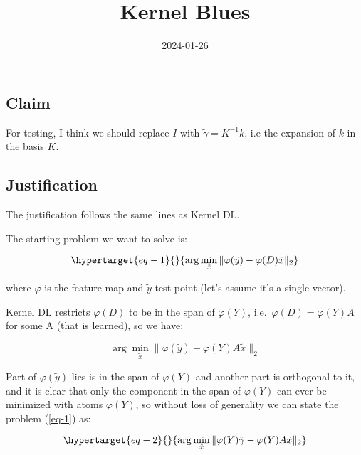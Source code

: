 \documentclass[
  letterpaper,
  DIV=11,
  numbers=noendperiod]{scrartcl}
\title{Kernel Blues}
\author{}
\date{2024-01-26}
\renewcommand*\contentsname{Table of contents}
\newcommand\contentsname{Table of contents}
\begin{document}
\maketitle
\ifdefined\Shaded\renewenvironment{Shaded}{\begin{tcolorbox}[frame hidden, sharp corners, borderline west={3pt}{0pt}{shadecolor}, breakable, enhanced, boxrule=0pt, interior hidden]}{\end{tcolorbox}}\fi

\renewcommand*\contentsname{Table of contents}
{
\hypersetup{linkcolor=}
\setcounter{tocdepth}{3}
\tableofcontents
}
\hypertarget{claim}{%
\subsection{Claim}\label{claim}}

For testing, I think we should replace \(I\) with
\(\tilde{\gamma} = K^{-1} k\), i.e the expansion of \(k\) in the basis
\(K\).

\hypertarget{justification}{%
\subsection{Justification}\label{justification}}

The justification follows the same lines as Kernel DL.

The starting problem we want to solve is:

\begin{equation}\protect\hypertarget{eq-1}{}{\arg\min_{\tilde{x}} \|\varphi(\tilde{y}) - \varphi(D) \tilde{x}\|_2}\label{eq-1}\end{equation}

where \(\varphi\) is the feature map and \(\tilde{y}\) test point (let's
assume it's a single vector).

Kernel DL restricts \(\varphi(D)\) to be in the span of \(\varphi(Y)\),
i.e.~\(\varphi(D) = \varphi(Y) A\) for some A (that is learned), so we
have:

\[\arg\min_{\tilde{x}} \|\varphi(\tilde{y}) - \varphi(Y) A \tilde{x}\|_2\]

Part of \(\varphi(\tilde{y})\) lies is in the span of \(\varphi(Y)\) and
another part is orthogonal to it, and it is clear that only the
component in the span of \(\varphi(Y)\) can ever be minimized with atoms
\(\varphi(Y)\), so without loss of generality we can state the problem
(\ref{eq-1}) as:

\begin{equation}\protect\hypertarget{eq-2}{}{\arg\min_{\tilde{x}} \|\varphi(Y) \tilde{\gamma} - \varphi(Y) A \tilde{x}\|_2}\label{eq-2}\end{equation}
\end{document}
